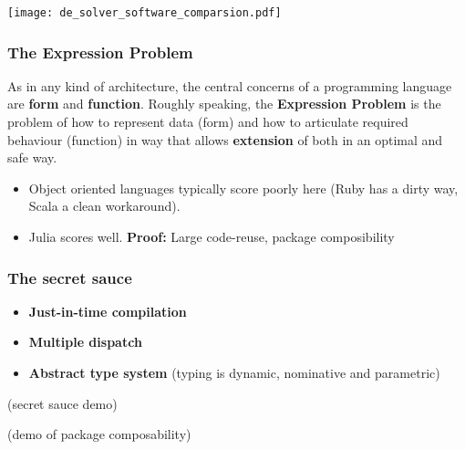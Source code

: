 \documentclass[t]{beamer}
\newcommand\df{\bf\color{Maroon}}
\begin{document}
\begin{frame}[plain]
     \texttt{[image: de\_solver\_software\_comparsion.pdf]}
\end{frame}

% 





\begin{frame}
  \frametitle{The Expression Problem}
  As in any kind of architecture, the central concerns of a
  programming language are {\df form} and {\df function}. Roughly
  speaking, the {\df Expression Problem} is the problem of how to
  represent data (form) and how to articulate required behaviour
  (function) in way that allows {\df extension} of both in an optimal
  and safe way.\pause
  \begin{itemize}
    \item Object oriented languages typically score poorly here (Ruby has a
      dirty way, Scala a clean workaround).
    \item Julia scores well. {\df Proof:} \pause Large code-reuse, package composibility
  \end{itemize}
\end{frame}

\begin{frame}
  \frametitle{The secret sauce}
    \begin{itemize}
    \item {\df Just-in-time compilation}
    \item {\df Multiple dispatch}
    \item {\df Abstract type system} (typing is dynamic, nominative and parametric)
  \end{itemize}
\end{frame}

\begin{frame}
  (secret sauce demo)
\end{frame}

\begin{frame}
  (demo of package composability)
\end{frame}
\end{document}
